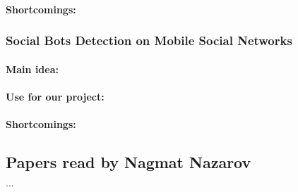 \paragraph{Shortcomings:}

\subsubsection{Social Bots Detection on Mobile Social Networks}

\paragraph{Main idea:}
\cite{binlin2017social}

\paragraph{Use for our project:}

\paragraph{Shortcomings:}

\subsection{Papers read by Nagmat Nazarov}

$\ldots$

